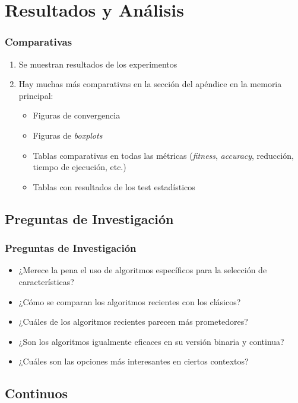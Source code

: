 \section{Resultados y Análisis}

\begin{frame}
    \frametitle{Comparativas}
    \begin{enumerate}
        \item Se muestran resultados de los experimentos
        \item Hay muchas más comparativas en la sección del apéndice en la memoria principal:
        \begin{itemize}
            \item Figuras de convergencia
            \item Figuras de \textit{boxplots}
            \item Tablas comparativas en todas las métricas (\textit{fitness}, \textit{accuracy}, reducción, tiempo de ejecución, etc.)
            \item Tablas con resultados de los test estadísticos
        \end{itemize}
    \end{enumerate}
\end{frame}

\subsection{Preguntas de Investigación}
\begin{frame}
    \frametitle{Preguntas de Investigación}
    \begin{itemize}
        \item<1-> ¿Merece la pena el uso de algoritmos específicos para la selección de características?
        \item<2-> ¿Cómo se comparan los algoritmos recientes con los clásicos?
        \item<3-> ¿Cuáles de los algoritmos recientes parecen más prometedores?
        \item<4-> ¿Son los algoritmos igualmente eficaces en su versión binaria y continua?
        \item<5-> ¿Cuáles son las opciones más interesantes en ciertos contextos?
    \end{itemize}
\end{frame}

\subsection{Continuos}


